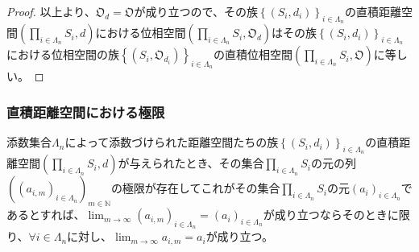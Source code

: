\documentclass[dvipdfmx]{jsarticle}
\begin{document}
\begin{proof}
以上より、$\mathfrak{O}_{d} = \mathfrak{O}$が成り立つので、その族$\left\{ \left( S_{i},d_{i} \right) \right\}_{i \in \varLambda_{n}}$の直積距離空間$\left( \prod_{i \in \varLambda_{n}} S_{i},d \right)$における位相空間$\left( \prod_{i \in \varLambda_{n}} S_{i},\mathfrak{O}_{d} \right)$はその族$\left\{ \left( S_{i},d_{i} \right) \right\}_{i \in \varLambda_{n}}$における位相空間の族$\left\{ \left( S_{i},\mathfrak{O}_{d_{i}} \right) \right\}_{i \in \varLambda_{n}}$の直積位相空間$\left( \prod_{i \in \varLambda_{n}} S_{i},\mathfrak{O} \right)$に等しい。
\end{proof}
\subsubsection{直積距離空間における極限}%
\begin{thm}\label{8.2.1.23}
添数集合$\varLambda_{n}$によって添数づけられた距離空間たちの族$\left\{ \left( S_{i},d_{i} \right) \right\}_{i \in \varLambda_{n}}$の直積距離空間$\left( \prod_{i \in \varLambda_{n}} S_{i},d \right)$が与えられたとき、その集合$\prod_{i \in \varLambda_{n}} S_{i}$の元の列$\left( \left( a_{i,m} \right)_{i \in \varLambda_{n}} \right)_{m \in \mathbb{N}}$の極限が存在してこれがその集合$\prod_{i \in \varLambda_{n}} S_{i}$の元$\left( a_{i} \right)_{i \in \varLambda_{n}}$であるとすれば、$\lim_{m \rightarrow \infty}\left( a_{i,m} \right)_{i \in \varLambda_{n}} = \left( a_{i} \right)_{i \in \varLambda_{n}}$が成り立つならそのときに限り、$\forall i \in \varLambda_{n}$に対し、$\lim_{m \rightarrow \infty}a_{i,m} = a_{i}$が成り立つ。
\end{thm}
\end{document}
